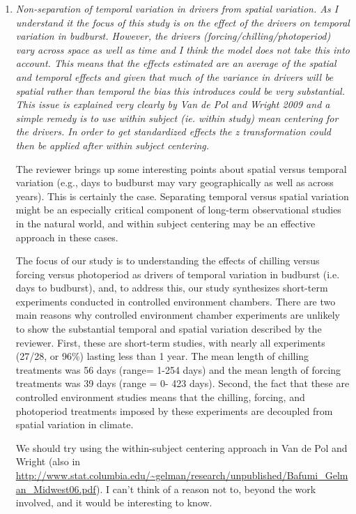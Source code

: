 \documentclass[11pt, a4paper]{article}
\begin{document}
\begin{enumerate}
\item \emph{Non-separation of temporal variation in drivers from spatial variation. As I understand it the
focus of this study is on the effect of the drivers on temporal variation in budburst. However,
the drivers (forcing/chilling/photoperiod) vary across space as well as time and I think the
model does not take this into account. This means that the effects estimated are an average of
the spatial and temporal effects and given that much of the variance in drivers will be spatial
rather than temporal the bias this introduces could be very substantial. This issue is explained
very clearly by Van de Pol and Wright 2009 and a simple remedy is to use within subject (ie.
within study) mean centering for the drivers. In order to get standardized effects the z
transformation could then be applied after within subject centering.}
\par The reviewer brings up some interesting points about spatial versus temporal variation (e.g., days to budburst may vary geographically as well as across years). This is certainly the case. Separating temporal versus spatial variation might be an especially critical component of long-term observational studies in the natural world, and within subject centering may be an effective approach in these cases.  
\par The focus of our study is to understanding the effects of chilling versus forcing versus photoperiod as drivers of temporal variation in budburst (i.e. days to budburst), and, to address this, our study synthesizes short-term experiments conducted in controlled environment chambers. There are two main reasons why controlled environment chamber experiments are unlikely to show the substantial temporal and spatial variation described by the reviewer. First, these are short-term studies, with nearly all experiments (27/28, or 96\%) lasting less than 1 year. The mean length of chilling treatments was 56 days (range= 1-254 days) and the mean length of forcing treatments was 39 days (range = 0- 423 days). Second, the fact that these are controlled environment studies means that the chilling, forcing, and photoperiod treatments imposed by these experiments are decoupled from spatial variation in climate. 
\par We should try using the within-subject centering approach in Van de Pol and Wright (also in \url{http://www.stat.columbia.edu/~gelman/research/unpublished/Bafumi_Gelman_Midwest06.pdf}). I can't think of a reason not to, beyond the work involved, and it would be interesting to know.

\end{enumerate}
\end{document}
